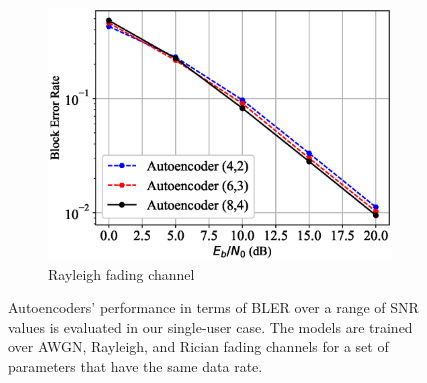 \begin{figure}[tp!]
\begin{subfigure}{0.28\textwidth}
		\includegraphics[width=\linewidth]{figs/autoencoder_bler_rayleigh}
		\caption{Rayleigh fading channel}	
	\end{subfigure}
	\caption{Autoencoders' performance in terms of BLER over a range of SNR values is evaluated in our single-user case. The models are trained over AWGN, Rayleigh, and Rician fading channels for a set of parameters that have the same data rate.}
	\label{fig:autoencoder_bler}
\end{figure}
